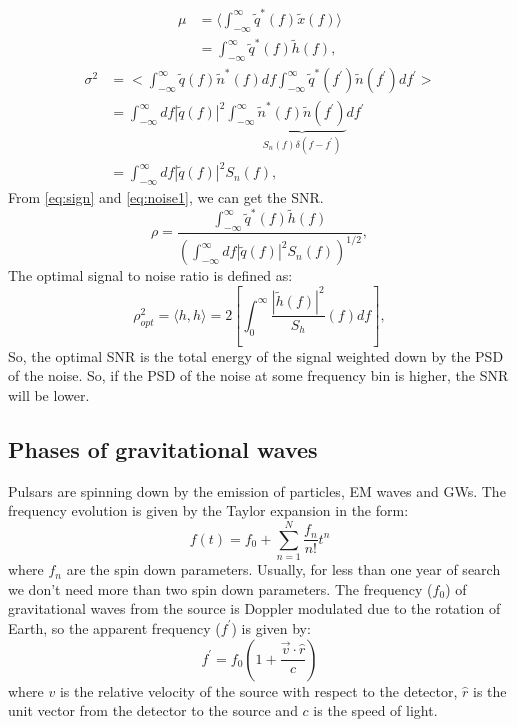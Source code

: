 \documentclass{ttuthes2007}
\begin{document}
\begin{equation}\label{eq:sign}
\begin{split}
\mu & = \langle\int_{-\infty}^{\infty}\tilde{q}^{*}(f)\tilde{x}(f)\rangle\\
&=\int_{-\infty}^{\infty}\tilde{q}^{*}(f)\tilde{h}(f),
\end{split}
\end{equation}
\begin{equation}\label{eq:noise1}
\begin{split}
\sigma^{2} & =<\int_{-\infty}^{\infty}\tilde{q}(f)\tilde{n}^{*}(f)df
\int_{-\infty}^{\infty} \tilde{q}^{*}(f^{'}) \tilde{n}(f^{'})df^{'}>\\
       &= \int_{-\infty}^{\infty}df|\tilde{q}(f)|^{2}
\int_{-\infty}^{\infty}\underbrace{\tilde{n}^{*}(f)
\tilde{n}(f^{'})}_{S_{n}(f)\delta(f - f^{'})}df^{'}\\
      &=\int_{-\infty}^{\infty}df|\tilde{q}(f)|^{2} S_{n}(f),
\end{split}
\end{equation}
From \ref{eq:sign} and \ref{eq:noise1}, we can get the \ac{SNR}.
\begin{equation}
\rho=\frac{\int_{-\infty}^{\infty}\tilde{q}^{*}(f)\tilde{h}(f)}{(\int_{-\infty}^{\infty}df|\tilde{q}(f)|^2
S_{n}(f))^{1/2}},
\end{equation}
The optimal signal to noise ratio is defined as:
\begin{equation}
\rho_{opt}^2 = \langle h,h \rangle
=2\left[\int_{0}^{\infty}\frac{|\tilde{h}(f)|^2}{S_{h}}(f){}df\right],
\end{equation}
So, the optimal \ac{SNR} is the total energy of the signal weighted down by the
\ac{PSD} of the noise. So, if the \ac{PSD} of the noise at some frequency bin is higher,
the \ac{SNR} will be lower.


\subsection{Phases of gravitational waves}
Pulsars are spinning down by the emission of particles, \ac{EM} waves and \acp{GW}.
The frequency evolution is given by the Taylor expansion in the form:
\begin{equation}
f(t) = f_0 + \sum_{n=1}^{N} \frac{f_n}{n!}t^n
\end{equation}
where $f_n$ are the spin down parameters. Usually, for less than one year of
search we don't need more than two spin down parameters. 
The frequency ($f_0$) of gravitational waves from the source is Doppler modulated due to the
rotation of Earth, so the apparent frequency ($f^\prime$) is given by:
\begin{equation} 
f^\prime = f_0 \left(1+\frac{\vec{v}\cdot\hat{r}}{c}\right)
\end{equation}
where $v$ is the relative velocity of the source with respect to the detector, $\hat{r}$
is the unit vector from the detector to the source and $c$ is the speed of light.
\end{document}
